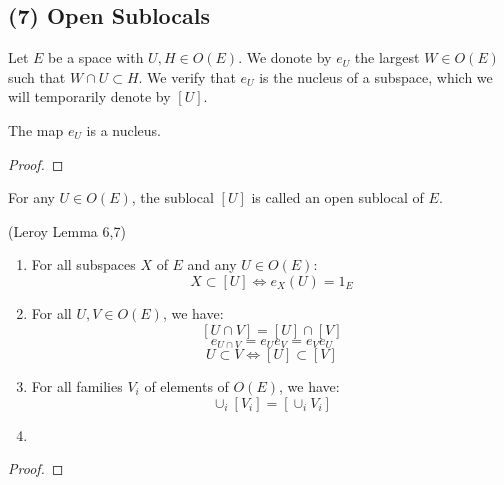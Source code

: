 \subsection{(7) Open Sublocals}

\begin{definition}[$e_U$]
    \label{def:e_U}
    \leanok
    Let $E$ be a space with $U, H \in O(E)$. We donote by $e_U$ the largest $W \in O(E)$ such that $W \cap U \subset H$. We verify that $e_U$ is the nucleus of a subspace, which we will temporarily denote by $[U]$.
\end{definition}

\begin{lemma}[$e_U$ is a nucleus]
    \label{lem:e_U_nucleus}
    \leanok
    The map $e_U$ is a nucleus.
\end{lemma}
\begin{proof}
    \leanok
\end{proof}


\begin{definition}
    \label{def:open_sublocal}
    \leanok
    For any $U \in O(E)$, the sublocal $[U]$ is called an open sublocal of $E$.
\end{definition}


\begin{lemma}
(Leroy Lemma 6,7)
    \label{lem:sublocal_properties}
    \leanok
    \begin{enumerate}
        \item For all subspaces $X$ of $E$ and any $U \in O(E)$:
        \[X \subset [U] \iff e_X(U) = 1_E\]

        \item For all $U, V \in O(E)$, we have:
        \[[U \cap V] = [U] \cap [V]\]
        \[e_{U \cap V} = e_Ue_V=e_Ve_U\]
        \[U \subset V \iff [U] \subset [V]\]
        \item
        For all families $V_i$ of elements of $O(E)$, we have:
        \[\cup_i[V_i] = [\cup_iV_i]\]

        \item
    \end{enumerate}
\end{lemma}
\begin{proof}
    \leanok
\end{proof}


